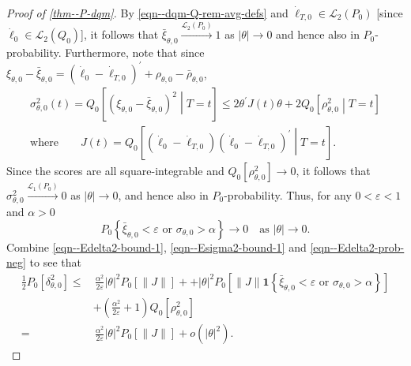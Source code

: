 \documentclass[12pt]{article}
\let\Cref\autoref
\def\L{\mathscr{L}}
\def\ind{\mathbf{1}}
\theoremstyle{definition}
\theoremstyle{plain}
\begin{document}
\begin{proof}[Proof of \Cref{thm--P-dqm}]
By \eqref{eqn--dqm-Q-rem-avg-defs} and \(\dot{\ell}_{T, 0} \in \L_{2} \left(
P_{0} \right)\) [since \(\dot{\ell}_{0} \in \L_{2} \left( Q_{0} \right)\)],
it follows that \(\bar{\xi}_{\theta, 0} \overset{\L_{2} \left( P_{0}
\right)}{\to} 1\) as \(|\theta| \to 0\) and hence also in \(P_{0}\)-probability.
Furthermore, note that since \(\xi_{\theta, 0} - \bar{\xi}_{\theta, 0} = \left(
\dot{\ell}_{0} - \dot{\ell}_{T, 0} \right)^{\prime} + \rho_{\theta, 0} -
\bar{\rho}_{\theta, 0}\),
\begin{equation}
  \begin{gathered}
    \sigma_{\theta, 0}^{2} (t) = Q_{0} \left[ \left( \xi_{\theta, 0} -
    \bar{\xi}_{\theta, 0} \right)^{2} \middle| T = t \right] \leq
    2 \theta^{\prime} J (t) \theta + 2 Q_{0} \left[
    \rho_{\theta, 0}^{2} \middle| T = t \right] \\
    \text{where} \qquad J (t) = Q_{0} \left[ \left( \dot{\ell}_{0} -
    \dot{\ell}_{T, 0} \right) \left( \dot{\ell}_{0} - \dot{\ell}_{T, 0}
    \right)^{\prime} \middle| T = t \right].
  \end{gathered}
  \label{eqn--Esigma2-bound-1}
\end{equation}
Since the scores are all square-integrable and \(Q_{0} \left[ \rho_{\theta,
0}^{2} \right] \to 0\), it follows that \(\sigma_{\theta, 0}^{2} \overset{\L_{1}
\left( P_{0} \right)}{\to} 0\) as \(|\theta| \to 0\), and hence also in
\(P_{0}\)-probability.
Thus, for any \(0 < \varepsilon < 1\) and \(\alpha > 0\)
\begin{equation}
  P_{0} \left\{ \bar{\xi}_{\theta, 0} < \varepsilon \text{ or } \sigma_{\theta,
  0} > \alpha \right\} \to 0 \quad \text{as } |\theta| \to 0.
  \label{eqn--Edelta2-prob-neg}
\end{equation}
Combine \eqref{eqn--Edelta2-bound-1}, \eqref{eqn--Esigma2-bound-1} and
\eqref{eqn--Edelta2-prob-neg} to see that
\begin{equation*}
  \begin{split}
    \frac{1}{2} P_{0} \left[ \delta_{\theta, 0}^{2} \right] \leq
    & \, \frac{\alpha^{2}}{2 \varepsilon} |\theta|^{2} P_{0} [\|J\|] +
    + |\theta|^{2} P_{0} \left[ \|J\| \ind \left\{ \bar{\xi}_{\theta, 0} <
    \varepsilon \text{ or } \sigma_{\theta, 0} > \alpha \right\} \right] \\
    & + \left( \frac{\alpha^{2}}{2 \varepsilon} + 1 \right)Q_{0} \left[
    \rho_{\theta, 0}^{2} \right] \\
    =
    & \, \frac{\alpha^{2}}{2 \varepsilon} |\theta|^{2} P_{0} [\|J\|] + o \left(
   |\theta|^{2} \right).

\end{split}
\end{equation*}
\end{proof}
\end{document}
